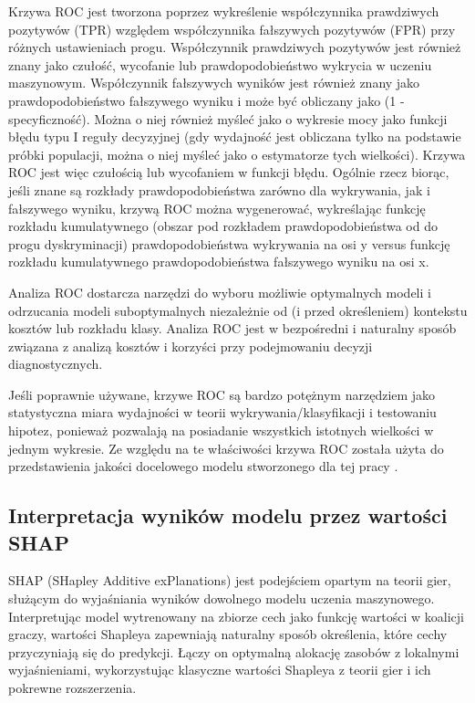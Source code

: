 \documentclass[polish, twoside, 12pt, a4paper]{article}
\theoremstyle{definition}
\theoremstyle{plain}
\theoremstyle{remark}
\begin{document}
Krzywa ROC jest tworzona poprzez wykreślenie współczynnika prawdziwych pozytywów (TPR) względem współczynnika fałszywych pozytywów (FPR) przy różnych ustawieniach progu. Współczynnik prawdziwych pozytywów jest również znany jako czułość, wycofanie lub prawdopodobieństwo wykrycia w uczeniu maszynowym. Współczynnik fałszywych wyników jest również znany jako prawdopodobieństwo fałszywego wyniku i może być obliczany jako (1 - specyficzność). Można o niej również myśleć jako o wykresie mocy jako funkcji błędu typu I reguły decyzyjnej (gdy wydajność jest obliczana tylko na podstawie próbki populacji, można o niej myśleć jako o estymatorze tych wielkości). Krzywa ROC jest więc czułością lub wycofaniem w funkcji błędu. Ogólnie rzecz biorąc, jeśli znane są rozkłady prawdopodobieństwa zarówno dla wykrywania, jak i fałszywego wyniku, krzywą ROC można wygenerować, wykreślając funkcję rozkładu kumulatywnego (obszar pod rozkładem prawdopodobieństwa od do progu dyskryminacji) prawdopodobieństwa wykrywania na osi y versus funkcję rozkładu kumulatywnego prawdopodobieństwa fałszywego wyniku na osi x.

Analiza ROC dostarcza narzędzi do wyboru możliwie optymalnych modeli i odrzucania modeli suboptymalnych niezależnie od (i przed określeniem) kontekstu kosztów lub rozkładu klasy. Analiza ROC jest w bezpośredni i naturalny sposób związana z analizą kosztów i korzyści przy podejmowaniu decyzji diagnostycznych.

Jeśli poprawnie używane, krzywe ROC są bardzo potężnym narzędziem jako statystyczna miara wydajności w teorii wykrywania/klasyfikacji i testowaniu hipotez, ponieważ pozwalają na posiadanie wszystkich istotnych wielkości w jednym wykresie. Ze względu na te właściwości krzywa ROC została użyta do przedstawienia jakości docelowego modelu stworzonego dla tej pracy \citep{fawcett2005}.

\subsection{Interpretacja wyników modelu przez wartości SHAP}

SHAP (SHapley Additive exPlanations) jest podejściem opartym na teorii gier, służącym do wyjaśniania wyników dowolnego modelu uczenia maszynowego. Interpretując model wytrenowany na zbiorze cech jako funkcję wartości w koalicji graczy, wartości Shapleya zapewniają naturalny sposób określenia, które cechy przyczyniają się do predykcji. Łączy on optymalną alokację zasobów z lokalnymi wyjaśnieniami, wykorzystując klasyczne wartości Shapleya z teorii gier i ich pokrewne rozszerzenia.
\end{document}

